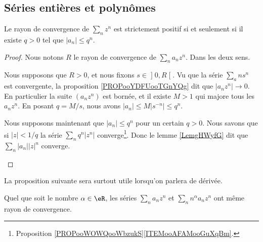 \subsection{Séries entières et polynômes}


\begin{proposition}	\label{PROPooEFCNooCAcSIx}
	Le rayon de convergence de \( \sum_nz^n\) est strictement positif si et seulement si il existe \( q>0\) tel que \( | a_n |\leq q^n\).
\end{proposition}

\begin{proof}
	Nous notons \( R\) le rayon de convergence de \( \sum_na_nz^n\). Dans les deux sens.
	\begin{subproof}
		\spitem[\( \Rightarrow\)]
		Nous supposons que \( R>0\), et nous fixons \( s\in \mathopen] 0,R\mathclose[\). Vu que la série \( \sum_ans^n\) est convergente, la proposition \ref{PROPooYDFUooTGnYQg} dit que \( | a_nz^n |\to 0\). En particulier la suite \( (a_nz^n)\) est bornée, et il existe \( M>1\) qui majore tous les \( a_nz^n\). En posant \( q=M/s\), nous avons \( | a_n |\leq M| s^{-n} |\leq q^n\).

		\spitem[\( \Leftarrow\)]
		Nous supposons maintenant que \( | a_n |\leq q^n\) pour un certain \( q>0\). Nous savons que  si \( | z |<1/q\) la série \( \sum_nq^n| z^n |\) converge\footnote{Proposition \ref{PROPooWOWQooWbzukS}\ref{ITEMooAFAMooGuXqBm}.}. Donc le lemme \ref{LemgHWyfG} dit que \( \sum_n| a_n || z |^n\) converge.
	\end{subproof}
\end{proof}

La proposition suivante sera surtout utile lorsqu'on parlera de dérivée.
\begin{proposition}        \label{PropHDIUooKTbVSX}
	Quel que soit le nombre \( \alpha\in \eR\), les séries \( \sum_na_nz^n\) et \( \sum_nn^{\alpha}a_nz^n\) ont même rayon de convergence.
\end{proposition}

